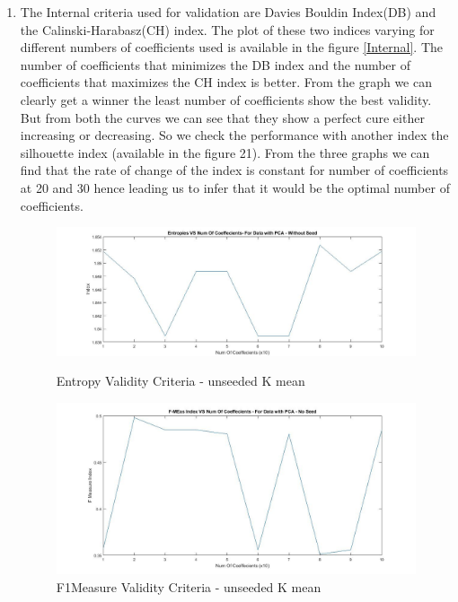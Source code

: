 \documentclass[conference]{IEEEtran}
\begin{document}
\begin{enumerate}
\begin{figure}
\end{figure}
\item The Internal criteria used for validation are Davies Bouldin Index(DB) and the  Calinski-Harabasz(CH) index. The plot of these two indices varying for different numbers of coefficients used is available in the figure \ref{Internal}. The number of coefficients that minimizes the DB index and the number of coefficients that maximizes the CH index is better. From the graph we can clearly get a winner the least number of coefficients show the best validity. But from both the curves we can see that they show a perfect cure either increasing or decreasing. So we check the performance with another index the silhouette index (available in the figure 21). From the three graphs we can find that the rate of change of the index is constant for number of coefficients at 20 and 30 hence leading us to infer that it would be the optimal number of coefficients. 
\begin{figure}
\centering
\includegraphics[width=20cm]{Entropies_withPCA_withoutSeed.jpg}
\caption{Entropy Validity Criteria - unseeded K mean}
\includegraphics[width=20cm]{Fmeasure_withPCA_withoutSeed.jpg}
\caption{F1Measure Validity Criteria - unseeded K mean}
\label{External}
\end{figure}
\begin{figure}
\centering

\end{figure}
\end{enumerate}
\end{document}
